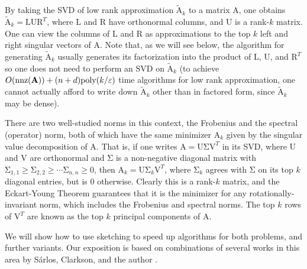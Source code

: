 \documentclass[11pt]{article}
\newcommand{\mat}[1]{{\ensuremath{\bm{\mathrm{#1}}}}}
\def\matA{\mat{A}}
\def\matL{\mat{L}}
\def\matR{\mat{R}}
\def\matU{\mat{U}}
\def\matV{\mat{V}}
\def\nnz{{ \rm nnz }}
\newcommand{\eps}{\varepsilon}
\newcommand{\poly}{{\mathrm{poly}}}
\begin{document}
By taking the SVD of low rank approximation $\tilde{\matA}_k$ to a matrix $\matA$, 
one obtains $\tilde{\matA}_k = \matL \matU \matR^T$, where
$\matL$ and $\matR$ have orthonormal columns, 
and $\matU$ is a rank-$k$ matrix. One can view the columns of $\matL$ and $\matR$ as approximations
to the top $k$ left and right singular vectors of $\matA$.  Note that, as we will see below, the algorithm for generating
$\tilde{\matA}_k$ usually generates its factorization into the product of $\matL$, $\matU$, and $\matR^T$ 
so one does not need to perform
an SVD on $\tilde{\matA}_k$ (to achieve $O(\nnz(\matA)) + (n+d)\poly(k/\eps)$ time algorithms for low rank approximation, one
cannot actually afford to write down $\tilde{\matA}_k$ other than in factored form, since $\tilde{\matA}_k$ may be dense). 

There are two well-studied norms in this context, the Frobenius
and the spectral (operator) norm, both of which have the same minimizer 
$\matA_k$ given by the singular value decomposition of $\matA$. That is, if one
writes $\matA = \matU \mat\Sigma \matV^T$ in its SVD, where $\matU$ and $\matV$ are orthonormal
and $\mat\Sigma$ is a non-negative diagonal matrix with 
$\mat\Sigma_{1,1} \geq \mat\Sigma_{2,2} \geq \cdots \mat\Sigma_{n,n} \geq 0$, 
then $\matA_k = \matU \mat\Sigma_k \matV^T$, where $\mat\Sigma_k$ agrees with $\mat\Sigma$ on its
top $k$ diagonal entries, but is $0$ otherwise. Clearly this is a rank-$k$
matrix, and the Eckart-Young Theorem guarantees that it is the minimizer
for any rotationally-invariant norm, which includes the Frobenius and
spectral norms. The top $k$ rows of $\matV^T$ are known as the top $k$ principal 
components of $\matA$. 

We will show how
to use sketching to speed up algorithms for both problems, and further variants.
Our exposition is based on combinations of several works in this area by S\'arlos,
Clarkson, and the author \cite{S06,CW09,CW13}. 
\end{document}
